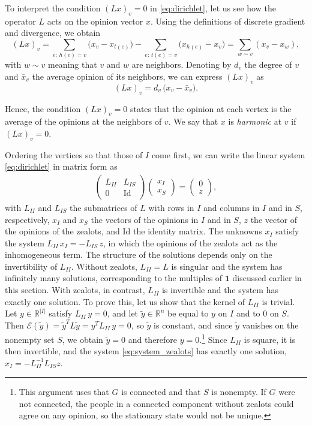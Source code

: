 \documentclass[11pt,a4paper]{article}
\theoremstyle{plain}
\theoremstyle{definition}
\newcommand{\R}{\mathbb{R}}
\begin{document}
To interpret the condition $(Lx)_v=0$ in \eqref{eq:dirichlet}, let us see how the operator $L$ acts on the opinion vector $x$. Using the definitions of discrete gradient and divergence, we obtain
\[
(Lx)_v=\sum_{e:\,h(e)=v}\bigl(x_v-x_{t(e)}\bigr)-\sum_{e:\,t(e)=v}\bigl(x_{h(e)}-x_v\bigr)=\sum_{w\sim v}(x_v-x_w),
\]
with $w\sim v$ meaning that $v$ and $w$ are neighbors. Denoting by $d_v$ the degree of $v$ and $\bar x_v$ the average opinion of its neighbors, we can express $(Lx)_v$ as
\begin{equation}\label{eq:mean}
(Lx)_v=d_v\,\bigl(x_v-\bar x_v\bigr).
\end{equation}

Hence, the condition $(Lx)_v=0$ states that the opinion at each vertex is the average of the opinions at the neighbors of $v$. We say that $x$ is \emph{harmonic} at $v$ if $(Lx)_v=0$.

Ordering the vertices so that those of $I$ come first, we can write the linear system \eqref{eq:dirichlet} in matrix form as
\begin{align} \label{eq:system_zealots}
\begin{pmatrix} L_{II} & L_{IS}\\ 0 & \mathrm{Id}\end{pmatrix}\begin{pmatrix} x_I\\ x_S\end{pmatrix}=\begin{pmatrix} 0\\ z\end{pmatrix},
\end{align}
with $L_{II}$ and $L_{IS}$ the submatrices of $L$ with rows in $I$ and columns in $I$ and in $S$, respectively, $x_I$ and $x_S$ the vectors of the opinions in $I$ and in $S$, $z$ the vector of the opinions of the zealots, and $\mathrm{Id}$ the identity matrix. The unknowns $x_I$ satisfy the system $L_{II}\,x_I=-L_{IS}\,z$, in which the opinions of the zealots act as the inhomogeneous term. The structure of the solutions depends only on the invertibility of $L_{II}$. Without zealots, $L_{II}=L$ is singular and the system has infinitely many solutions, corresponding to the multiples of $\mathbf 1$ discussed earlier in this section. With zealots, in contrast, $L_{II}$ is invertible and the system has exactly one solution. To prove this, let us show that the kernel of $L_{II}$ is trivial. Let $y\in\R^{|I|}$ satisfy $L_{II}\,y=0$, and let $\tilde y\in\R^n$ be equal to $y$ on $I$ and to $0$ on $S$. Then $\mathcal{E}(\tilde y)$$=\tilde y^TL\tilde y=y^TL_{II}\,y=0$, so $\tilde y$ is constant, and since $\tilde y$ vanishes on the nonempty set $S$, we obtain $\tilde y=0$ and therefore $y=0$.\footnote{This argument uses that $G$ is connected and that $S$ is nonempty. If $G$ were not connected, the people in a connected component without zealots could agree on any opinion, so the stationary state would not be unique.} Since $L_{II}$ is square, it is then invertible, and the system \eqref{eq:system_zealots} has exactly one solution, $x_I=-L_{II}^{-1}L_{IS} z$.
\end{document}
